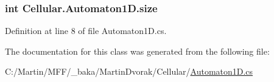 \subsubsection[{size}]{\setlength{\rightskip}{0pt plus 5cm}int Cellular.\+Automaton1\+D.\+size\hspace{0.3cm}{\ttfamily [protected]}}\label{class_cellular_1_1_automaton1_d_a915129ccf0f1e7092844c99ce6a28e5b}


Definition at line 8 of file Automaton1\+D.\+cs.



The documentation for this class was generated from the following file\+:\begin{DoxyCompactItemize}
\item 
C\+:/\+Martin/\+M\+F\+F/\+\_\+baka/\+Martin\+Dvorak/\+Cellular/\hyperlink{_automaton1_d_8cs}{Automaton1\+D.\+cs}\end{DoxyCompactItemize}
